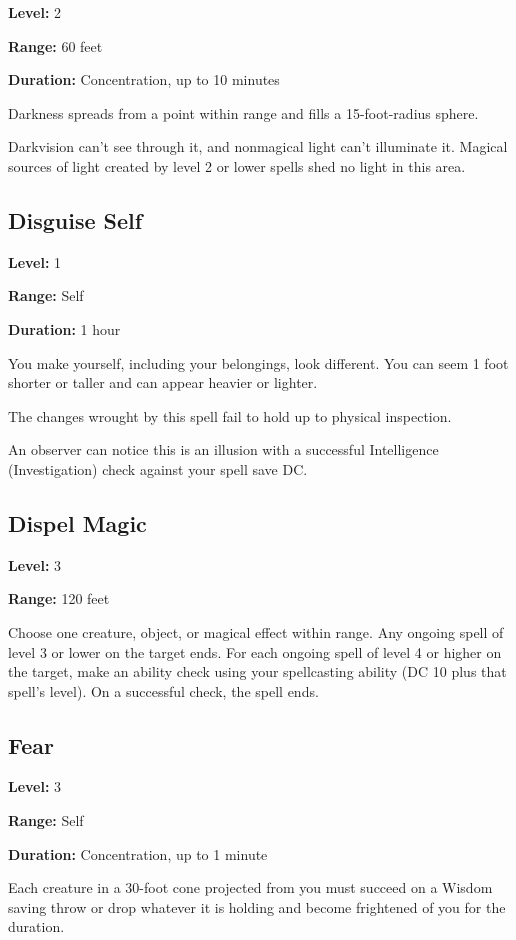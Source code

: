 \documentclass[12pt,letterpaper,twocolumn,openany,nodeprecatedcode,bg=none]{dndbook}
\let\oldsubsection\subsection
\renewcommand{\subsection}[1]{%
  \needspace{5\baselineskip}%
  \oldsubsection{#1}%
}
\begin{document}
\textbf{Level:} 2

\textbf{Range:} 60 feet

\textbf{Duration:} Concentration, up to 10 minutes

Darkness spreads from a point within range and fills a 15-foot-radius
sphere.

Darkvision can't see through it, and nonmagical light can't illuminate
it. Magical sources of light created by level 2 or lower spells shed no
light in this area.

\subsection{Disguise Self}\label{disguise-self}

\textbf{Level:} 1

\textbf{Range:} Self

\textbf{Duration:} 1 hour

You make yourself, including your belongings, look different. You can
seem 1 foot shorter or taller and can appear heavier or lighter.

The changes wrought by this spell fail to hold up to physical
inspection.

An observer can notice this is an illusion with a successful
Intelligence (Investigation) check against your spell save DC.

\subsection{Dispel Magic}\label{dispel-magic}

\textbf{Level:} 3

\textbf{Range:} 120 feet

Choose one creature, object, or magical effect within range. Any ongoing
spell of level 3 or lower on the target ends. For each ongoing spell of
level 4 or higher on the target, make an ability check using your
spellcasting ability (DC 10 plus that spell's level). On a successful
check, the spell ends.

\subsection{Fear}\label{fear}

\textbf{Level:} 3

\textbf{Range:} Self

\textbf{Duration:} Concentration, up to 1 minute

Each creature in a 30-foot cone projected from you must succeed on a
Wisdom saving throw or drop whatever it is holding and become frightened
of you for the duration.
\end{document}
